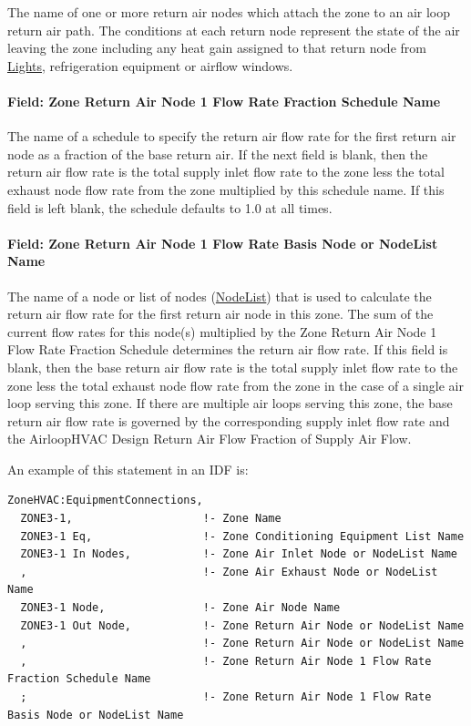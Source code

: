 The name of one or more return air nodes which attach the zone to an air loop return air path. The conditions at each return node represent the state of the air leaving the zone including any heat gain assigned to that return node from \hyperref[lights-000]{Lights}, refrigeration equipment or airflow windows.

\paragraph{Field: Zone Return Air Node 1 Flow Rate Fraction Schedule Name}\label{field-zone-return-air-flow-rate-fraction-schedule-name}

The name of a schedule to specify the return air flow rate for the first return air node as a fraction of the base return air. If the next field is blank, then the return air flow rate is the total supply inlet flow rate to the zone less the total exhaust node flow rate from the zone multiplied by this schedule name. If this field is left blank, the schedule defaults to 1.0 at all times.

\paragraph{Field: Zone Return Air Node 1 Flow Rate Basis Node or NodeList Name}\label{field-zone-return-air-flow-rate-basis-node-or-nodelist-name}

The name of a node or list of nodes (\hyperref[nodelist]{NodeList}) that is used to calculate the return air flow rate for the first return air node in this zone. The sum of the current flow rates for this node(s) multiplied by the Zone Return Air Node 1 Flow Rate Fraction Schedule determines the return air flow rate. If this field is blank, then the base return air flow rate is the total supply inlet flow rate to the zone less the total exhaust node flow rate from the zone in the case of a single air loop serving this zone. If there are multiple air loops serving this zone, the base return air flow rate is governed by the corresponding supply inlet flow rate and the AirloopHVAC Design Return Air Flow Fraction of Supply Air Flow.

An example of this statement in an IDF is:

\begin{lstlisting}
ZoneHVAC:EquipmentConnections,
  ZONE3-1,                    !- Zone Name
  ZONE3-1 Eq,                 !- Zone Conditioning Equipment List Name
  ZONE3-1 In Nodes,           !- Zone Air Inlet Node or NodeList Name
  ,                           !- Zone Air Exhaust Node or NodeList Name
  ZONE3-1 Node,               !- Zone Air Node Name
  ZONE3-1 Out Node,           !- Zone Return Air Node or NodeList Name
  ,                           !- Zone Return Air Node or NodeList Name
  ,                           !- Zone Return Air Node 1 Flow Rate Fraction Schedule Name
  ;                           !- Zone Return Air Node 1 Flow Rate Basis Node or NodeList Name
\end{lstlisting}


